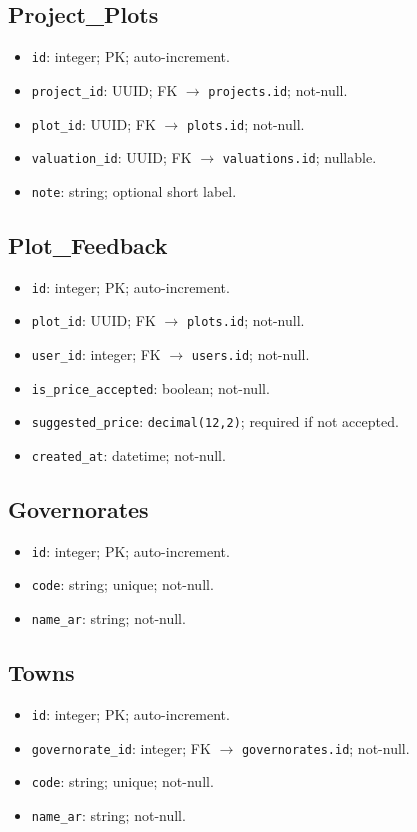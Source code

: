 \documentclass[12pt,oneside]{report}
\begin{document}
\subsection{Project\_Plots}
\begin{itemize}[leftmargin=*,itemsep=2pt]
  \item \texttt{id}: integer; PK; auto-increment.
  \item \texttt{project\_id}: UUID; FK $\rightarrow$ \texttt{projects.id}; not-null.
  \item \texttt{plot\_id}: UUID; FK $\rightarrow$ \texttt{plots.id}; not-null.
  \item \texttt{valuation\_id}: UUID; FK $\rightarrow$ \texttt{valuations.id}; nullable.
  \item \texttt{note}: string; optional short label.
\end{itemize}

\subsection{Plot\_Feedback}
\begin{itemize}[leftmargin=*,itemsep=2pt]
  \item \texttt{id}: integer; PK; auto-increment.
  \item \texttt{plot\_id}: UUID; FK $\rightarrow$ \texttt{plots.id}; not-null.
  \item \texttt{user\_id}: integer; FK $\rightarrow$ \texttt{users.id}; not-null.
  \item \texttt{is\_price\_accepted}: boolean; not-null.
  \item \texttt{suggested\_price}: \texttt{decimal(12,2)}; required if not accepted.
  \item \texttt{created\_at}: datetime; not-null.
\end{itemize}

\subsection{Governorates}
\begin{itemize}[leftmargin=*,itemsep=2pt]
  \item \texttt{id}: integer; PK; auto-increment.
  \item \texttt{code}: string; unique; not-null.
  \item \texttt{name\_ar}: string; not-null.
\end{itemize}

\subsection{Towns}
\begin{itemize}[leftmargin=*,itemsep=2pt]
  \item \texttt{id}: integer; PK; auto-increment.
  \item \texttt{governorate\_id}: integer; FK $\rightarrow$ \texttt{governorates.id}; not-null.
  \item \texttt{code}: string; unique; not-null.
  \item \texttt{name\_ar}: string; not-null.
\end{itemize}
\end{document}
